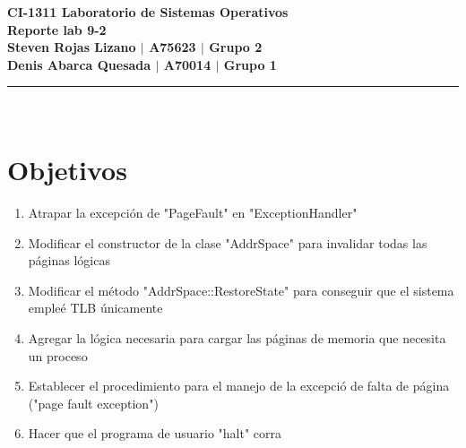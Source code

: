 \documentclass[11pt]{article}
\begin{document}
	
	
	\noindent\textbf{CI-1311 Laboratorio de Sistemas Operativos}\\
	\textbf{Reporte lab 9-2}\\
	\textbf{Steven Rojas Lizano $|$ A75623 $|$ Grupo 2}\\
  \textbf{Denis Abarca Quesada $|$ A70014 $|$ Grupo 1}\\
	\rule{400pt}{0.1pt}\\ 
	
	\section{Objetivos}
	\begin{enumerate}
	  \item 
    Atrapar la excepción de "PageFault" en "ExceptionHandler"
    \item Modificar el constructor de la clase "AddrSpace" para invalidar todas las páginas lógicas
    \item Modificar el método "AddrSpace::RestoreState" para conseguir que el sistema empleé TLB únicamente
    \item Agregar la lógica necesaria para cargar las páginas de memoria que necesita un proceso
    \item Establecer el procedimiento para el manejo de la excepció de falta de página ("page fault exception")
\item     Hacer que el programa de usuario "halt" corra

	\end{enumerate}
\end{document}
